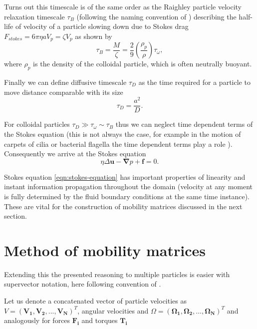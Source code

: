 \documentclass{doctoral}
\begin{document}
Turns out this timescale is of the same order as the Raighley particle velocity relaxation timescale $\tau_B$ (following the naming convention of \textcite{vanKampen_2011}) describing the half-life of velocity of a particle slowing down due to Stokes drag $F_{stokes} = 6 \pi \eta a V_p = \zeta V_p$ as shown by
\begin{equation}
    \tau_B = \frac{M}{\zeta} = \frac{2}{9} \left( \frac{\rho_p}{\rho} \right) \tau_\omega, \label{eqn:raighley-timescale}
\end{equation}
where $\rho_p$ is the density of the colloidal particle, which is often neutrally buoyant.

Finally we can define diffusive timescale $\tau_D$ as the time required for a particle to move distance comparable with its size
\begin{equation}
    \tau_D = \frac{a^2}{D}.
    \label{eqn:diffusive-timescale}
\end{equation}

For colloidal particles $\tau_D \gg \tau_\omega \sim \tau_B$ thus we can neglect time dependent terms of the Stokes equation (this is not always the case, for example in the motion of carpets of cilia or bacterial flagella the time dependent terms play a role \cite{Wei_2021}).
Consequently we arrive at the Stokes equation
\begin{equation}
    \eta \Delta \bm{u} - \bm{\nabla} p + \bm{f} = 0.
    \label{eqn:stokes-equation}
\end{equation}

Stokes equation \eqref{eqn:stokes-equation} has important properties of linearity and instant information propagation throughout the domain (velocity at any moment is fully determined by the fluid boundary conditions at the same time instance).
These are vital for the construction of mobility matrices discussed in the next section.

\section{Method of mobility matrices}

Extending this the presented reasoning to multiple particles is easier with supervector notation, here following convention of \cite{Nagele_2013}.

Let us denote a concatenated vector of particle velocities as $V = (\bm{V_1},\bm{V_2},.
    ..,\bm{V_N})^{T}$, angular velocities and $\Omega = (\bm{\Omega_1},\bm{\Omega_2},...,\bm{\Omega_N})^{T}$ and analogously for forces $\bm{F_i}$ and torques $\bm{T_i}$
\end{document}

